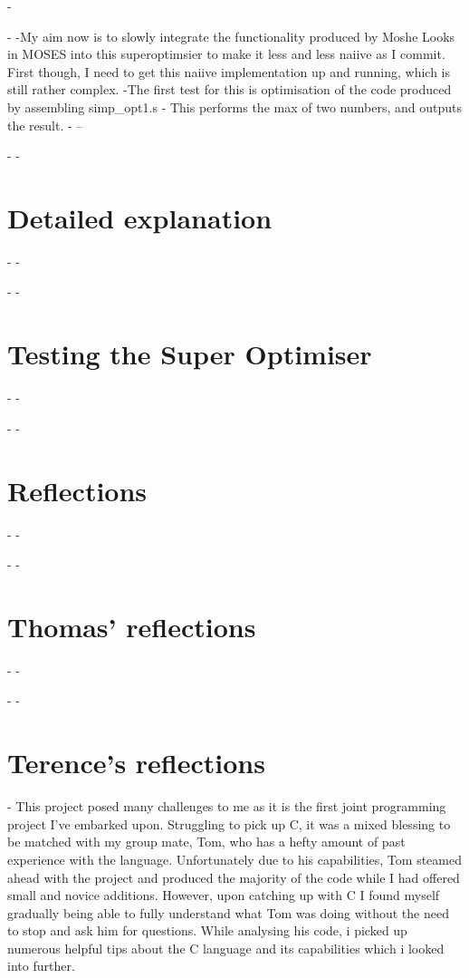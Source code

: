 -\documentclass[11pt]{article}
\begin{document}
-
-My aim now is to slowly integrate the functionality produced by Moshe Looks in MOSES into this superoptimsier to make it less and less naiive as I commit. First though, I need to get this naiive implementation up and running, which is still rather complex. 
-The first test for this is optimisation of the code produced by assembling simp_opt1.s - This performs the max of two numbers, and outputs the result.
-
--\maketitle
-
-\section{Detailed explanation}
-
-\maketitle
-
-\section{Testing the Super Optimiser}
-
-\maketitle
-
-\section{Reflections}
-
-\maketitle
-
-\section{Thomas' reflections}
-
-\maketitle
-
-\section{Terence's reflections}
- This project posed many challenges to me as it is the first joint programming project I've embarked upon. Struggling to pick up C, it was a mixed blessing to be matched with my group mate, Tom, who has a hefty amount of past experience with the language. Unfortunately due to his capabilities, Tom steamed ahead with the project and produced the majority of the code while I had offered small and novice additions. However, upon catching up with C I found myself gradually being able to fully understand what Tom was doing without the need to stop and ask him for questions. While analysing his code, i picked up numerous helpful tips about the C language and its capabilities which i looked into further.
\end{document}
